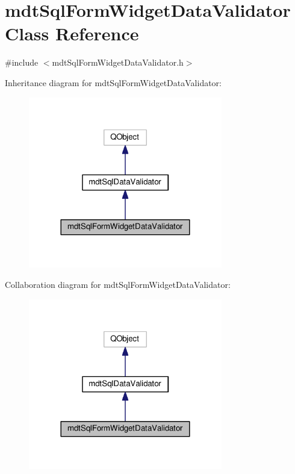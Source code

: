 \hypertarget{classmdt_sql_form_widget_data_validator}{\section{mdt\-Sql\-Form\-Widget\-Data\-Validator Class Reference}
\label{classmdt_sql_form_widget_data_validator}
}


{\ttfamily \#include $<$mdt\-Sql\-Form\-Widget\-Data\-Validator.\-h$>$}



Inheritance diagram for mdt\-Sql\-Form\-Widget\-Data\-Validator\-:\nopagebreak
\begin{figure}[H]
\begin{center}
\leavevmode
\includegraphics[width=240pt]{classmdt_sql_form_widget_data_validator__inherit__graph}
\end{center}
\end{figure}


Collaboration diagram for mdt\-Sql\-Form\-Widget\-Data\-Validator\-:\nopagebreak
\begin{figure}[H]
\begin{center}
\leavevmode
\includegraphics[width=240pt]{classmdt_sql_form_widget_data_validator__coll__graph}
\end{center}
\end{figure}
